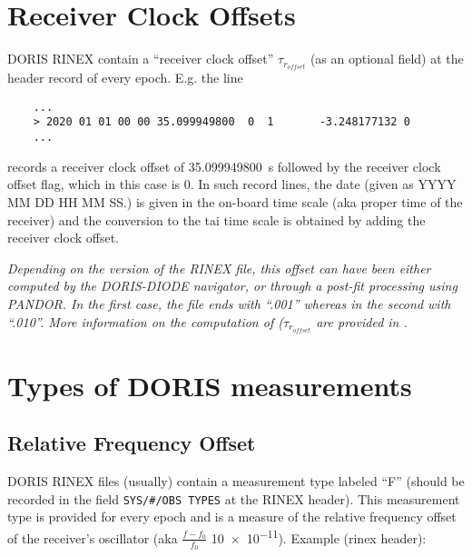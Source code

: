 \section{Receiver Clock Offsets}

DORIS RINEX contain a ``receiver clock offset'' \(\tau_{r_{offset}}\) (as an 
optional field) at the header record of every epoch. E.g. the line
\begin{verbatim}
    ...
    > 2020 01 01 00 00 35.099949800  0  1       -3.248177132 0
    ...
\end{verbatim}
records a receiver clock offset of \SI{35.099949800}{\second} followed by the 
receiver clock offset flag, which in this case is \num{0}. In such record 
lines, the date (given as YYYY MM DD HH MM SS.) is given in the on-board time 
scale (aka proper time of the receiver) and the conversion to the \gls{tai} 
time scale is obtained by adding the receiver clock offset.

\textit{Depending on the version of the RINEX file, this offset can have been either 
computed by the DORIS-DIODE navigator, or through a post-fit processing using PANDOR. 
In the first case, the file ends with ``.001'' whereas in the second with ``.010''. 
More information on the computation of (\(\tau_{r_{offset}}\) are provided in 
\cite{lemoine-2016}.}

\section{Types of DORIS measurements}
\label{sec:types-of-doris-measurements}

\subsection{Relative Frequency Offset}
\label{ssec:relative-frequency-offset}

DORIS RINEX files (usually) contain a measurement type labeled ``F'' (should be 
recorded in the field \verb|SYS/#/OBS TYPES| at the RINEX header). This measurement 
type is provided for every epoch and is a measure of the relative frequency 
offset of the receiver's oscillator (aka \(\frac{f-f_0}{f_0}\) \num{10e-11}).
Example (rinex header):

